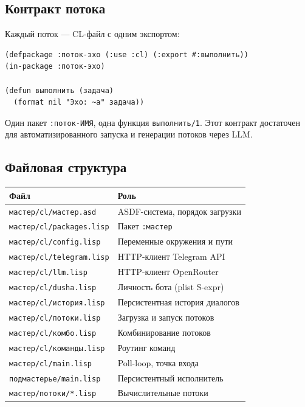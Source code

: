\documentclass[11pt,a4paper]{article}
\begin{document}
\subsection{Контракт потока}

Каждый поток — CL-файл с одним экспортом:

\begin{lstlisting}[caption={Минимальный поток}]
(defpackage :поток-эхо (:use :cl) (:export #:выполнить))
(in-package :поток-эхо)

(defun выполнить (задача)
  (format nil "Эхо: ~a" задача))
\end{lstlisting}

Один пакет \texttt{:поток-ИМЯ}, одна функция \texttt{выполнить/1}. Этот контракт достаточен для автоматизированного запуска и генерации потоков через LLM.

\subsection{Файловая структура}

\begin{table}[H]\centering\small
\begin{tabular}{ll}
\toprule
\textbf{Файл} & \textbf{Роль} \\
\midrule
\texttt{мастер/cl/мастер.asd}    & ASDF-система, порядок загрузки \\
\texttt{мастер/cl/packages.lisp} & Пакет \texttt{:мастер} \\
\texttt{мастер/cl/config.lisp}   & Переменные окружения и пути \\
\texttt{мастер/cl/telegram.lisp} & HTTP-клиент Telegram API \\
\texttt{мастер/cl/llm.lisp}      & HTTP-клиент OpenRouter \\
\texttt{мастер/cl/dusha.lisp}    & Личность бота (plist S-expr) \\
\texttt{мастер/cl/история.lisp}  & Персистентная история диалогов \\
\texttt{мастер/cl/потоки.lisp}   & Загрузка и запуск потоков \\
\texttt{мастер/cl/комбо.lisp}    & Комбинирование потоков \\
\texttt{мастер/cl/команды.lisp}  & Роутинг команд \\
\texttt{мастер/cl/main.lisp}     & Poll-loop, точка входа \\
\texttt{подмастерье/main.lisp}   & Персистентный исполнитель \\
\texttt{мастер/потоки/*.lisp}    & Вычислительные потоки \\
\bottomrule
\end{tabular}
\end{table}
\end{document}

